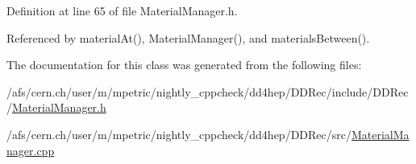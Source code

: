 Definition at line 65 of file Material\+Manager.\+h.



Referenced by material\+At(), Material\+Manager(), and materials\+Between().



The documentation for this class was generated from the following files\+:\begin{DoxyCompactItemize}
\item 
/afs/cern.\+ch/user/m/mpetric/nightly\+\_\+cppcheck/dd4hep/\+D\+D\+Rec/include/\+D\+D\+Rec/\hyperlink{_material_manager_8h}{Material\+Manager.\+h}\item 
/afs/cern.\+ch/user/m/mpetric/nightly\+\_\+cppcheck/dd4hep/\+D\+D\+Rec/src/\hyperlink{_material_manager_8cpp}{Material\+Manager.\+cpp}\end{DoxyCompactItemize}
